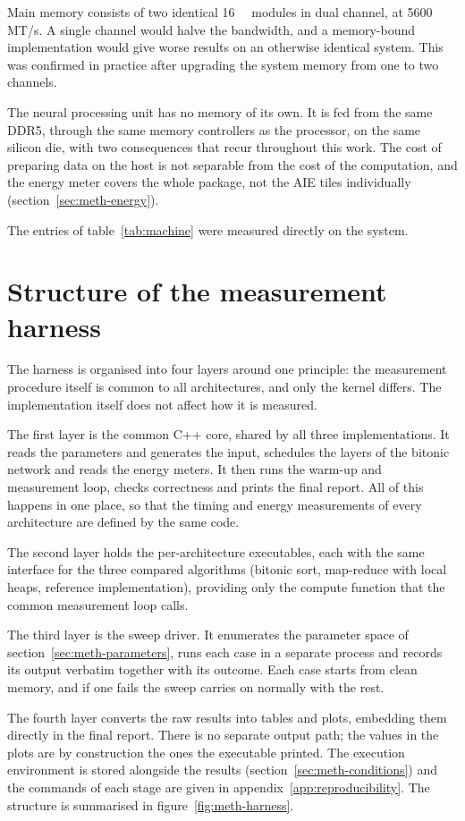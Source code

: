 Main memory consists of two identical \qty{16}{\gibi\byte} modules in dual
channel, at 5600 MT/s. A single channel would halve the bandwidth, and a
memory-bound implementation would give worse results on an otherwise identical
system. This was confirmed in practice after upgrading the system memory from
one to two channels.

The neural processing unit has no memory of its own. It is fed from the same
DDR5, through the same memory controllers as the processor, on the same silicon
die, with two consequences that recur throughout this work. The cost of
preparing data on the host is not separable from the cost of the computation,
and the energy meter covers the whole package, not the AIE tiles individually
(section~\ref{sec:meth-energy}).

The entries of table~\ref{tab:machine} were measured directly on the system.

\section{Structure of the measurement harness}
\label{sec:meth-harness}

The harness is organised into four layers around one principle: the measurement
procedure itself is common to all architectures, and only the kernel differs.
The implementation itself does not affect how it is measured.

The first layer is the common C++ core, shared by all three implementations. It
reads the parameters and generates the input, schedules the layers of the
bitonic network and reads the energy meters. It then runs the warm-up and
measurement loop, checks correctness and prints the final report. All of this
happens in one place, so that the timing and energy measurements of every
architecture are defined by the same code.

The second layer holds the per-architecture executables, each with the same
interface for the three compared algorithms (bitonic sort, map-reduce with
local heaps, reference implementation), providing only the compute function
that the common measurement loop calls.

The third layer is the sweep driver. It enumerates the parameter space of
section~\ref{sec:meth-parameters}, runs each case in a separate process and
records its output verbatim together with its outcome. Each case starts from
clean memory, and if one fails the sweep carries on normally with the rest.

The fourth layer converts the raw results into tables and plots, embedding them
directly in the final report. There is no separate output path; the values in
the plots are by construction the ones the executable printed. The execution
environment is stored alongside the results (section~\ref{sec:meth-conditions})
and the commands of each stage are given in appendix~\ref{app:reproducibility}.
The structure is summarised in figure~\ref{fig:meth-harness}.

